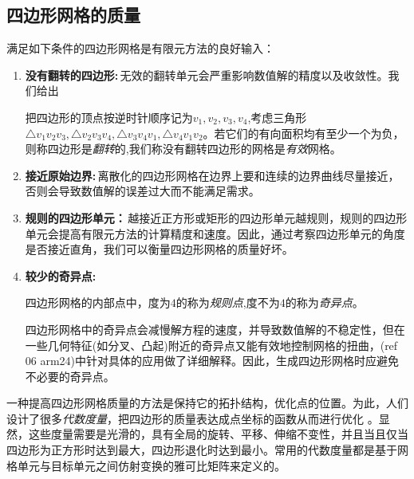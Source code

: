 \subsection{四边形网格的质量}\label{sec:quad-metric}
满足如下条件的四边形网格是有限元方法的良好输入：
\begin{enumerate}
	\item \textbf{没有翻转的四边形:}\,无效的翻转单元会严重影响数值解的精度以及收敛性。我们给出
	\begin{definition}\label{def:invertquad}
		把四边形的顶点按逆时针顺序记为$v_1,v_2,v_3,v_4$,考虑三角形$\triangle v_1v_2v_3,\triangle v_2v_3v_4,\triangle v_3v_4v_1,\triangle v_4v_1v_2$。若它们的有向面积均有至少一个为负，则称四边形是\emph{翻转}的,我们称没有翻转四边形的网格是\emph{有效}网格。
	\end{definition}
	\item \textbf{接近原始边界:}\,离散化的四边形网格在边界上要和连续的边界曲线尽量接近，否则会导致数值解的误差过大而不能满足需求。
	
	\item \textbf{规则的四边形单元：}\,越接近正方形或矩形的四边形单元越规则，规则的四边形单元会提高有限元方法的计算精度和速度。因此，通过考察四边形单元的角度是否接近直角，我们可以衡量四边形网格的质量好坏。
	\item \textbf{较少的奇异点:}\,
		\begin{definition}\label{singularity}
			四边形网格的内部点中，度为$4$的称为\emph{规则点},度不为$4$的称为\emph{奇异点}。
		\end{definition}
		四边形网格中的奇异点会减慢解方程的速度，并导致数值解的不稳定性，但在一些几何特征(如分叉、凸起)附近的奇异点又能有效地控制网格的扭曲，(ref 06 arm24)中针对具体的应用做了详细解释。因此，生成四边形网格时应避免不必要的奇异点。

\end{enumerate}

一种提高四边形网格质量的方法是保持它的拓扑结构，优化点的位置。为此，人们设计了很多\emph{代数度量}，把四边形的质量表达成点坐标的函数从而进行优化 。显然，这些度量需要是光滑的，具有全局的旋转、平移、伸缩不变性，并且当且仅当四边形为正方形时达到最大，四边形退化时达到最小。常用的代数度量都是基于网格单元与目标单元之间仿射变换的雅可比矩阵来定义的。


